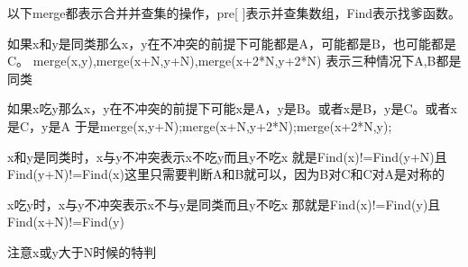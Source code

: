 \documentclass[UTF8]{ctexart}
\begin{document}
	以下merge都表示合并并查集的操作，pre[ ]表示并查集数组，Find表示找爹函数。
	
	如果x和y是同类那么x，y在不冲突的前提下可能都是A，可能都是B，也可能都是C。
	merge(x,y),merge(x+N,y+N),merge(x+2*N,y+2*N) 表示三种情况下A,B都是同类
	
	如果x吃y那么x，y在不冲突的前提下可能x是A，y是B。或者x是B，y是C。或者x是C，y是A
	于是merge(x,y+N);merge(x+N,y+2*N);merge(x+2*N,y);
	
	x和y是同类时，x与y不冲突表示x不吃y而且y不吃x 就是Find(x)!=Find(y+N)且Find(y+N)!=Find(x)这里只需要判断A和B就可以，因为B对C和C对A是对称的
	
	x吃y时，x与y不冲突表示x不与y是同类而且y不吃x 那就是Find(x)!=Find(y)且Find(x+N)!=Find(y)
	
	注意x或y大于N时候的特判
\end{document}
